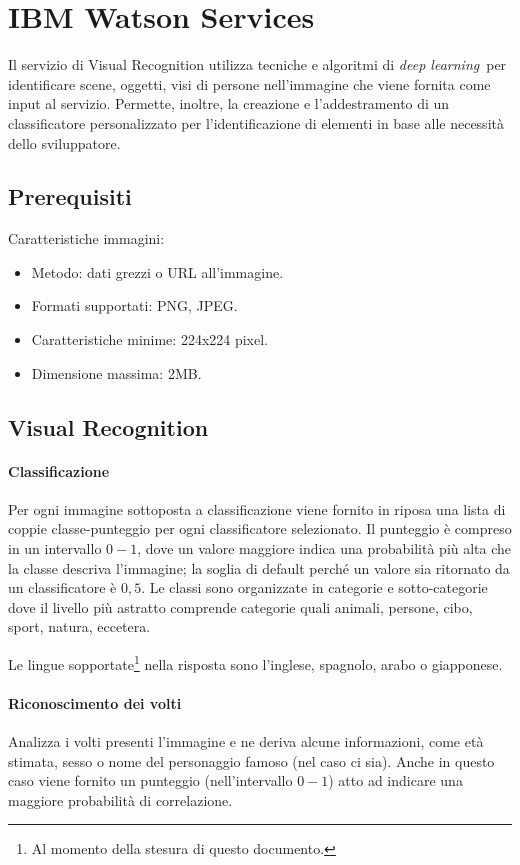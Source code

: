 \section{IBM Watson Services}
Il servizio di Visual Recognition\cite{ibm-api} utilizza tecniche e algoritmi di \textit{deep learning} per identificare scene, oggetti, visi di persone nell'immagine che viene fornita come input al servizio. Permette, inoltre, la creazione e l'addestramento di un classificatore personalizzato per l'identificazione di elementi in base alle necessità dello sviluppatore.

\subsection{Prerequisiti}
Caratteristiche immagini:
\begin{itemize}
\item Metodo: dati grezzi o URL all'immagine.
\item Formati supportati: PNG, JPEG.
\item Caratteristiche minime: 224x224 pixel. 
\item Dimensione massima: 2MB.
\end{itemize}


\subsection{Visual Recognition}
\paragraph{Classificazione} Per ogni immagine sottoposta a classificazione viene fornito in riposa una lista di coppie classe-punteggio per ogni classificatore selezionato. Il punteggio è compreso in un intervallo $0-1$, dove un valore maggiore indica una probabilità più alta che la classe descriva l'immagine; la soglia di default perché un valore sia ritornato da un classificatore è $0,5$.
Le classi sono organizzate in categorie e sotto-categorie dove il livello più astratto comprende categorie quali animali, persone, cibo, sport, natura, eccetera.

Le lingue sopportate\footnote{Al momento della stesura di questo documento.} nella risposta sono l'inglese, spagnolo, arabo o giapponese. 

\paragraph{Riconoscimento dei volti} Analizza i volti presenti l'immagine e ne deriva alcune informazioni, come età stimata, sesso o nome del personaggio famoso (nel caso ci sia). Anche in questo caso viene fornito un punteggio (nell'intervallo $0-1$) atto ad indicare una maggiore probabilità di correlazione.

